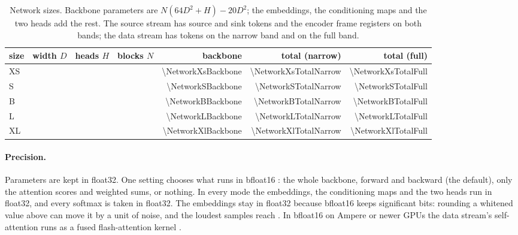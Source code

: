 \begin{table}[t]
\caption{Network sizes. Backbone parameters are $N(64D^2 + H) - 20D^2$; the embeddings, the
conditioning maps and the two heads add the rest. The source stream has \NetworkSourcesWord{}
source and \NetworkSinksWord{} sink tokens and the encoder \NetworkSourcesWord{} frame registers on
both bands; the data stream has \NetworkTokensNarrow{} tokens on the narrow band and
\NetworkTokensFull{} on the full band.}
\label{tab:network-sizes}
\centering
\small
\begin{tabular}{@{}lrrrrrr@{}}
\toprule
size & width $D$ & heads $H$ & blocks $N$ & backbone & total (narrow) & total (full) \\
\midrule
XS & \NetworkXsWidth{} & \NetworkXsHeads{} & \NetworkXsBlocks{} & \num{\NetworkXsBackbone} & \num{\NetworkXsTotalNarrow} & \num{\NetworkXsTotalFull} \\
S  & \NetworkSWidth{}  & \NetworkSHeads{}  & \NetworkSBlocks{}  & \num{\NetworkSBackbone}  & \num{\NetworkSTotalNarrow}  & \num{\NetworkSTotalFull} \\
B  & \NetworkBWidth{}  & \NetworkBHeads{}  & \NetworkBBlocks{}  & \num{\NetworkBBackbone}  & \num{\NetworkBTotalNarrow}  & \num{\NetworkBTotalFull} \\
L  & \NetworkLWidth{}  & \NetworkLHeads{}  & \NetworkLBlocks{}  & \num{\NetworkLBackbone}  & \num{\NetworkLTotalNarrow}  & \num{\NetworkLTotalFull} \\
XL & \NetworkXlWidth{} & \NetworkXlHeads{} & \NetworkXlBlocks{} & \num{\NetworkXlBackbone} & \num{\NetworkXlTotalNarrow} & \num{\NetworkXlTotalFull} \\
\bottomrule
\end{tabular}
\end{table}

\paragraph{Precision.}
Parameters are kept in float32. One setting chooses what runs in bfloat16
\citep{micikevicius2018mixed,kalamkar2019study}: the whole backbone, forward and backward (the
default), only the attention scores and weighted sums, or nothing. In every mode the embeddings, the
conditioning maps and the two heads run in float32, and every softmax is taken in float32. The
embeddings stay in float32 because bfloat16 keeps \NetworkBfBits{} significant bits: rounding a
whitened value above \NetworkBfUnity{} can move it by a unit of noise, and the loudest samples reach
\NetworkSnrTop{}. In bfloat16 on Ampere or newer GPUs the data stream's self-attention runs as a
fused flash-attention kernel \citep{dao2022flashattention}.

